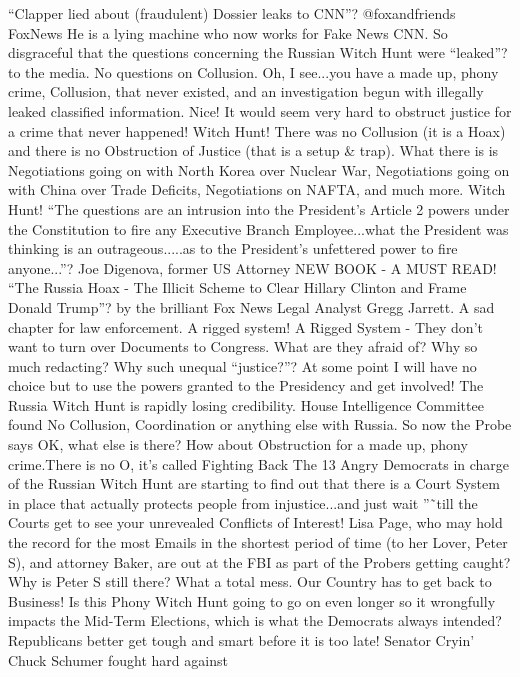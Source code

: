 ``Clapper lied about (fraudulent) Dossier leaks to CNN''? @foxandfriends
FoxNews He is a lying machine who now works for Fake News CNN. So
disgraceful that the questions concerning the Russian Witch Hunt were
``leaked''? to the media. No questions on Collusion. Oh, I see...you
have a made up, phony crime, Collusion, that never existed, and an
investigation begun with illegally leaked classified information. Nice!
It would seem very hard to obstruct justice for a crime that never
happened! Witch Hunt! There was no Collusion (it is a Hoax) and there is
no Obstruction of Justice (that is a setup \& trap). What there is is
Negotiations going on with North Korea over Nuclear War, Negotiations
going on with China over Trade Deficits, Negotiations on NAFTA, and much
more. Witch Hunt! ``The questions are an intrusion into the President's
Article 2 powers under the Constitution to fire any Executive Branch
Employee...what the President was thinking is an outrageous.....as to
the President's unfettered power to fire anyone...''? Joe Digenova,
former US Attorney NEW BOOK - A MUST READ! ``The Russia Hoax - The
Illicit Scheme to Clear Hillary Clinton and Frame Donald Trump''? by the
brilliant Fox News Legal Analyst Gregg Jarrett. A sad chapter for law
enforcement. A rigged system! A Rigged System - They don't want to turn
over Documents to Congress. What are they afraid of? Why so much
redacting? Why such unequal ``justice?''? At some point I will have no
choice but to use the powers granted to the Presidency and get involved!
The Russia Witch Hunt is rapidly losing credibility. House Intelligence
Committee found No Collusion, Coordination or anything else with Russia.
So now the Probe says OK, what else is there? How about Obstruction for
a made up, phony crime.There is no O, it's called Fighting Back The 13
Angry Democrats in charge of the Russian Witch Hunt are starting to find
out that there is a Court System in place that actually protects people
from injustice...and just wait ''˜till the Courts get to see your
unrevealed Conflicts of Interest! Lisa Page, who may hold the record for
the most Emails in the shortest period of time (to her Lover, Peter S),
and attorney Baker, are out at the FBI as part of the Probers getting
caught? Why is Peter S still there? What a total mess. Our Country has
to get back to Business! Is this Phony Witch Hunt going to go on even
longer so it wrongfully impacts the Mid-Term Elections, which is what
the Democrats always intended? Republicans better get tough and smart
before it is too late! Senator Cryin' Chuck Schumer fought hard against
